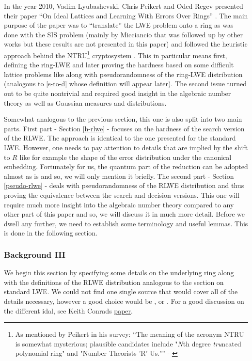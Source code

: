 In the year 2010, Vadim Lyubashevski, Chris Peikert and Oded Regev presented their paper ``On Ideal Lattices and Learning With Errors Over Rings'' \cite{ring-lwe}. The main purpose of the paper was to ``translate'' the LWE problem onto a ring as was done with the SIS problem (mainly by Micciancio \cite{ring-sis} that was followed up by other works but these results are not presented in this paper) and followed the heuristic approach behind the NTRU\footnote{As mentioned by Peikert in his survey: ``The meaning of the acronym NTRU is somewhat mysterious; plausible candidates include "$N$th degree \textit{tru}ncated polynomial ring" and "Number Theorists ’R’ Us."'' - \cite{lattice-survey}} cryptosystem \cite{ntru}. This in particular means first, defining the ring-LWE and later proving the hardness based on some difficult lattice problems like  along with pseudorandomness of the ring-LWE distribution (analogous to \ref{s-to-d} whose definition will appear later). The second issue turned out to be quite nontrivial and required good insight in the algebraic number theory as well as Gaussian measures and distributions.

Somewhat analogous to the previous section, this one is also split into two main parts. First part - Section \ref{h-rlwe} - focuses on the hardness of the search version of the RLWE. The approach is identical to the one presented for the standard LWE. However, one needs to pay attention to details that are implied by the shift to $R$ like for example the shape of the error distribution under the canonical embedding. Fortunately for us, the quantum part of the reduction can be adopted almost as is and so, we will only mention it briefly. The second part - Section \ref{pseudo-rlwe} - deals with pseudorandomness of the RLWE distribution and thus proving the equivalence between the search and decision versions. This one will require much more insight into the algebraic number theory compared to any other part of this paper and so, we will discuss it in much more detail. Before we dwell any further, we need to establish some terminology and useful lemmas. This is done in the following section.

\subsubsection{Background III}
We begin this section by specifying some details on the underlying ring along with the definitions of the RLWE distribution analogous to the section on standard LWE. We could not find one single source that would cover all of the details necessary, however a good choice would be \cite{algebra}, \cite{stein} or \cite{milne}. For a good discussion on the different idal, see Keith Conrads \href{https://kconrad.math.uconn.edu/blurbs/gradnumthy/different.pdf}{paper}.

